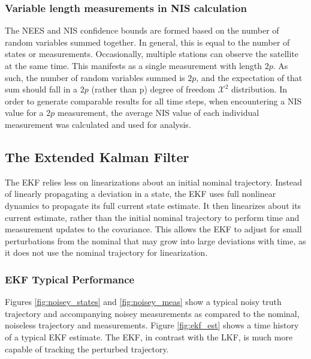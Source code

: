 \documentclass[11pt, a4paper]{article}
\begin{document}
\subsubsection{Variable length measurements in NIS calculation}
The NEES and NIS confidence bounds are formed based on the number of random variables summed together. 
In general, this is equal to the number of states or measurements. 
Occasionally, multiple stations can observe the satellite at the same time.
This manifests as a single measurement with length $2p$.
As such, the number of random variables summed is $2p$, and the expectation of that sum should fall in a $2p$ (rather than p) degree of freedom $\mathcal{X}^2$ distribution. 
In order to generate comparable results for all time steps, when encountering a NIS value for a $2p$ measurement, the average NIS value of each individual measurement was calculated and used for analysis.


\subsection{The Extended Kalman Filter}
\label{sec: EKF}
The EKF relies less on linearizations about an initial nominal trajectory.
Instead of linearly propagating a deviation in a state, the EKF uses full nonlinear dynamics to propagate its full current state estimate. 
It then linearizes about its current estimate, rather than the initial nominal trajectory to perform time and measurement updates to the covariance.   
This allows the EKF to adjust for small perturbations from the nominal that may grow into large deviations with time, as it does not use the nominal trajectory for linearization. 

\subsubsection{EKF Typical Performance}
Figures \ref{fig:noisey_states} and \ref{fig:noisey_meas} show a typical noisy truth trajectory and accompanying noisey measurements as compared to the nominal, noiseless trajectory and measurements. 
Figure \ref{fig:ekf_est} shows a time history of a typical EKF estimate. 
The EKF, in contrast with the LKF, is much more capable of tracking the perturbed trajectory.  
\end{document}
